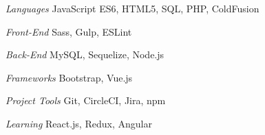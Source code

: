 \begin{minipage}[t]{0.53\textwidth}
\begin{cvskills}

  \cvskill
    {\textit{Languages}} %
    {JavaScript ES6, HTML5, SQL, PHP, ColdFusion} %


 \cvskill
    {\textit{Front-End}} %
    {Sass, Gulp, ESLint} %


  \cvskill
    {\textit{Back-End}} %
    {MySQL, Sequelize, Node.js} %

 
\end{cvskills}
\end{minipage}%
\begin{minipage}[t]{0.47\textwidth}
\begin{cvskills}

  \cvskill
    {\textit{Frameworks}} %
    {Bootstrap, Vue.js} %


  \cvskill
    {\textit{Project Tools}} %
    {Git, CircleCI, Jira, npm} %


  \cvskill
    {\textit{Learning}} %
    {React.js, Redux, Angular} %

\end{cvskills}
\end{minipage}

%
